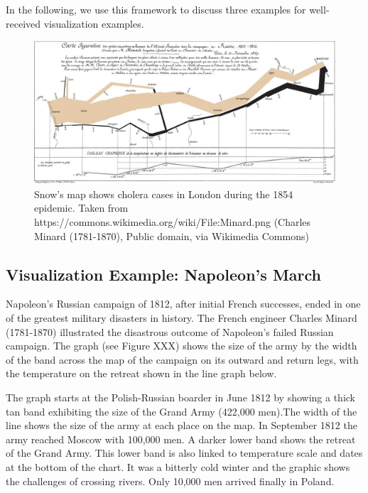 \documentclass[
]{book}
\begin{document}
In the following, we use this framework to discuss three examples for well-received visualization examples.

\begin{figure}

{\centering \includegraphics[width=0.75\linewidth]{images/minard-napoleon-march} 

}

\caption{Snow's map shows cholera cases in London during the 1854 epidemic. Taken from https://commons.wikimedia.org/wiki/File:Minard.png (Charles Minard (1781-1870), Public domain, via Wikimedia Commons)}\label{fig:unnamed-chunk-1}
\end{figure}

\hypertarget{visualization-example-napoleons-march}{%
\subsection{Visualization Example: Napoleon's March}\label{visualization-example-napoleons-march}}

Napoleon's Russian campaign of 1812, after initial French successes, ended in one of the greatest military disasters in history. The French engineer Charles Minard (1781-1870) illustrated the disastrous outcome of Napoleon's failed Russian campaign. The graph (see Figure XXX) shows the size of the army by the width of the band across the map of the campaign on its outward and return legs, with the temperature on the retreat shown in the line graph below.

The graph starts at the Polish-Russian boarder in June 1812 by showing a thick tan band exhibiting the size of the Grand Army (422,000 men).The width of the line shows the size of the army at each place on the map. In September 1812 the army reached Moscow with 100,000 men. A darker lower band shows the retreat of the Grand Army. This lower band is also linked to temperature scale and dates at the bottom of the chart. It was a bitterly cold winter and the graphic shows the challenges of crossing rivers. Only 10,000 men arrived finally in Poland.
\end{document}
